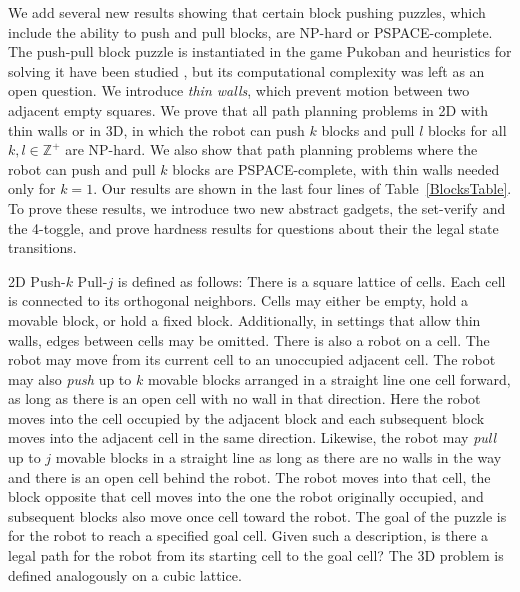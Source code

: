 We add several new results showing that certain block pushing puzzles, which include the ability to push and pull blocks, are NP-hard or PSPACE-complete. The push-pull block puzzle is instantiated in the game Pukoban and heuristics for solving it have been studied \cite{zubaranagent}, but its computational complexity was left as an open question.
We introduce \emph{thin walls}, which prevent motion between two adjacent empty squares. We prove that all path planning problems in 2D with thin walls or in 3D, in which the robot can push $k$ blocks and pull $l$ blocks for all $k,l \in \mathbb{Z}^+$ are NP-hard. We also show that path planning problems where the robot can push and pull $k$ blocks are PSPACE-complete, with thin walls needed only for $k=1$. Our results are shown in the last four lines of Table~\ref{BlocksTable}. To prove these results, we introduce two new abstract gadgets, the set-verify and the 4-toggle, and prove hardness results for questions about their the legal state transitions. %


2D Push-$k$ Pull-$j$ is defined as follows: There is a square lattice of cells. Each cell is connected to its orthogonal neighbors. Cells may either be empty, hold a movable block, or hold a fixed block. Additionally, in settings that allow thin walls, edges between cells may be omitted. There is also a robot on a cell. The robot may move from its current cell to an unoccupied adjacent cell. The robot may also \emph{push} up to $k$ movable blocks arranged in a straight line one cell forward, as long as there is an open cell with no wall in that direction. Here the robot moves into the cell occupied by the adjacent block and each subsequent block moves into the adjacent cell in the same direction. Likewise, the robot may \emph{pull} up to $j$ movable blocks in a straight line as long as there are no walls in the way and there is an open cell behind the robot. The robot moves into that cell, the block opposite that cell moves into the one the robot originally occupied, and subsequent blocks also move once cell toward the robot. The goal of the puzzle is for the robot to reach a specified goal cell. Given such a description, is there a legal path for the robot from its starting cell to the goal cell? The 3D problem is defined analogously on a cubic lattice.

